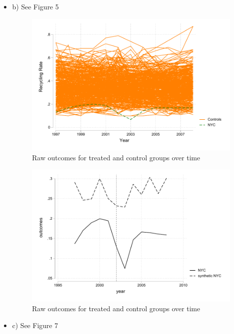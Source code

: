 \documentclass{article}
\begin{document}
\begin{enumerate}
\begin {itemize}
\item b) See Figure 5 

\begin{figure}[htbp]
    \centering
    \includegraphics[width=\textwidth]{HWQ5b1.pdf}
    \caption{Raw outcomes for treated and control groups over time}
    \label{fig:your_image_label}
\end{figure}

\begin{figure}[htbp]
    \centering
    \includegraphics[width=\textwidth]{HWQ5b2.pdf}
    \caption{Raw outcomes for treated and control groups over time}
    \label{fig:your_image_label}
\end{figure}
\item c) See Figure 7


\end{itemize}
\end{enumerate}
\end{document}
